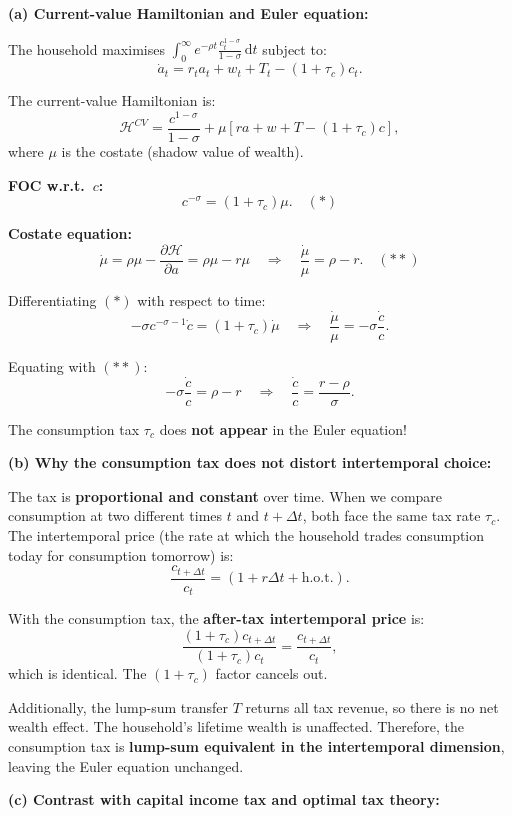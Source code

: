 \documentclass[a4paper,11pt]{article}
\newcommand{\dd}{\mathrm{d}}
\begin{document}
\begin{answerbox}
\textbf{(a) Current-value Hamiltonian and Euler equation:}

The household maximises $\int_0^\infty e^{-\rho t} \frac{c_t^{1-\sigma}}{1-\sigma}\,\dd t$ subject to:
\[
    \dot{a}_t = r_t a_t + w_t + T_t - (1+\tau_c)c_t.
\]

The current-value Hamiltonian is:
\[
    \mathcal{H}^{CV} = \frac{c^{1-\sigma}}{1-\sigma} + \mu\left[ra + w + T - (1+\tau_c)c\right],
\]
where $\mu$ is the costate (shadow value of wealth).

\textbf{FOC w.r.t.\ $c$:}
\[
    c^{-\sigma} = (1+\tau_c)\mu. \quad (*)
\]

\textbf{Costate equation:}
\[
    \dot{\mu} = \rho\mu - \frac{\partial\mathcal{H}}{\partial a} = \rho\mu - r\mu
    \quad\Longrightarrow\quad
    \frac{\dot{\mu}}{\mu} = \rho - r. \quad (**)
\]

Differentiating $(*)$ with respect to time:
\[
    -\sigma c^{-\sigma-1}\dot{c} = (1+\tau_c)\dot{\mu}
    \quad\Longrightarrow\quad
    \frac{\dot{\mu}}{\mu} = -\sigma\frac{\dot{c}}{c}.
\]

Equating with $(**)$:
\[
    -\sigma\frac{\dot{c}}{c} = \rho - r
    \quad\Longrightarrow\quad
    \boxed{\frac{\dot{c}}{c} = \frac{r - \rho}{\sigma}.}
\]

The consumption tax $\tau_c$ does \textbf{not appear} in the Euler equation!

\textbf{(b) Why the consumption tax does not distort intertemporal choice:}

The tax is \textbf{proportional and constant} over time. When we compare consumption at two different times $t$ and $t + \Delta t$, both face the same tax rate $\tau_c$. The intertemporal price (the rate at which the household trades consumption today for consumption tomorrow) is:
\[
    \frac{c_{t+\Delta t}}{c_t} = (1+r\Delta t + \text{h.o.t.}).
\]

With the consumption tax, the \textbf{after-tax intertemporal price} is:
\[
    \frac{(1+\tau_c)c_{t+\Delta t}}{(1+\tau_c)c_t} = \frac{c_{t+\Delta t}}{c_t},
\]
which is identical. The $(1+\tau_c)$ factor cancels out.

Additionally, the lump-sum transfer $T$ returns all tax revenue, so there is no net wealth effect. The household's lifetime wealth is unaffected. Therefore, the consumption tax is \textbf{lump-sum equivalent in the intertemporal dimension}, leaving the Euler equation unchanged.

\textbf{(c) Contrast with capital income tax and optimal tax theory:}


\end{answerbox}
\end{document}
